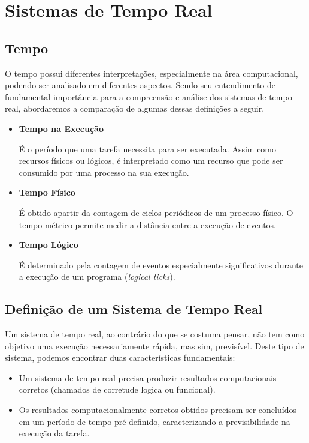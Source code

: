 \section{Sistemas de Tempo Real}

\subsection{Tempo}
O tempo possui diferentes interpretações, especialmente na área computacional,
podendo ser analisado em diferentes aspectos. Sendo seu entendimento de
fundamental importância para a compreensão e análise dos sistemas de tempo
real, abordaremos a comparação de algumas dessas definições a seguir.~\cite{Motus199321}

\begin{itemize}
\item \textbf{Tempo na Execução}

É o período que uma tarefa necessita para ser executada. Assim como recursos
físicos ou lógicos, é interpretado como um recurso que pode ser consumido
por uma processo na sua execução.

\item \textbf{Tempo Físico}

É obtido apartir da contagem de ciclos periódicos de um processo físico.
O tempo métrico permite medir a distância entre a execução de eventos.

\item \textbf{Tempo Lógico}

É determinado pela contagem de eventos especialmente significativos durante a execução de
um programa (\textit{logical ticks}).

\end{itemize}

\subsection{Definição de um Sistema de Tempo Real}
Um sistema de tempo real, ao contrário do que se costuma pensar, não tem
como objetivo uma execução necessariamente rápida, mas sim, previsível.
Deste tipo de sistema, podemos encontrar duas características fundamentais:

\begin{itemize}
\item Um sistema de tempo real precisa produzir resultados computacionais corretos
(chamados de corretude logica ou funcional).
\item Os resultados computacionalmente corretos obtidos precisam ser concluídos em
um período de tempo pré-definido, caracterizando a previsibilidade na execução da tarefa.
\end{itemize}

